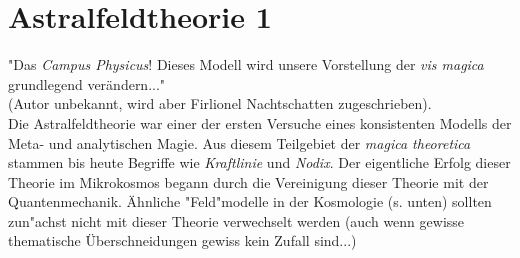 \chapter[tocentry=Astralfeldtheorie, head=UAstralfeldtheorie]{Astralfeldtheorie 1}
"Das \textit{Campus Physicus}! Dieses Modell wird unsere Vorstellung der \textit{vis magica} grundlegend verändern..."\\(Autor unbekannt, wird aber Firlionel Nachtschatten zugeschrieben). \\
Die Astralfeldtheorie war einer der ersten Versuche eines konsistenten Modells der Meta- und analytischen Magie. Aus diesem Teilgebiet der \textit{magica theoretica} stammen bis heute Begriffe wie \textit{Kraftlinie} und \textit{Nodix}. Der eigentliche Erfolg dieser Theorie im Mikrokosmos begann durch die Vereinigung dieser Theorie mit der Quantenmechanik.  Ähnliche "Feld"modelle in der Kosmologie (s. unten) sollten zun"achst nicht mit dieser Theorie verwechselt werden (auch wenn gewisse thematische Überschneidungen gewiss kein Zufall sind...)